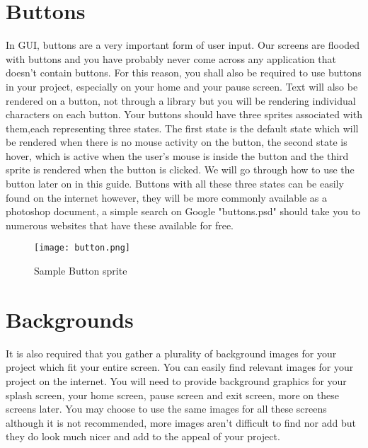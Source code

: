 \documentclass[11pt,fleqn]{book} %
\begin{document}
    \section{Buttons}
    In GUI, buttons are a very important form of user input. Our screens are flooded with buttons and you have probably never come across any application that doesn't contain buttons. For this reason, you shall also be required to use buttons in your project, especially on your home and your pause screen. Text will also be rendered on a button, not through a library but you will be rendering individual characters on each button. Your buttons should have three sprites associated with them,each representing three states. The first state is the default state which will be rendered when there is no mouse activity on the button, the second state is hover, which is active when the user's mouse is inside the button and the third sprite is rendered when the button is clicked. We will go through how to use the button later on in this guide. Buttons with all these three states can be easily found on the internet however, they will be more commonly available as a photoshop document, a simple search on Google "buttons.psd" should take you to numerous websites that have these available for free.
    \begin{figure}[ht]
            \centering
            \texttt{[image: button.png]}
            \caption{Sample Button sprite}
            \label{fig:my_label}
        \end{figure}
        
        
    \section{Backgrounds}
    It is also required that you gather a plurality of background images for your project which fit your entire screen. You can easily find relevant images for your project on the internet. You will need to provide background graphics for your splash screen, your home screen, pause screen and exit screen, more on these screens later. You may choose to use the same images for all these screens although it is not recommended, more images aren't difficult to find nor add but they do look much nicer and add to the appeal of your project.
    
    
\end{document}
